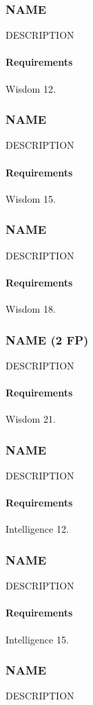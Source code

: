 \subsubsection{NAME} \label{feat::name}
    DESCRIPTION
    \paragraph{Requirements} Wisdom 12.
\subsubsection{NAME} \label{feat::name}
    DESCRIPTION
    \paragraph{Requirements} Wisdom 15.
\subsubsection{NAME} \label{feat::name}
    DESCRIPTION
    \paragraph{Requirements} Wisdom 18.
\subsubsection{NAME (2 FP)} \label{feat::name}
    DESCRIPTION
    \paragraph{Requirements} Wisdom 21.
\subsubsection{NAME} \label{feat::name}
    DESCRIPTION
    \paragraph{Requirements} Intelligence 12.
\subsubsection{NAME} \label{feat::name}
    DESCRIPTION
    \paragraph{Requirements} Intelligence 15.
\subsubsection{NAME} \label{feat::name}
    DESCRIPTION
